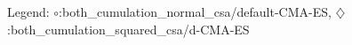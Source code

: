 Legend: {\color{CornflowerBlue}$\circ$}:both\_cumulation\_normal\_csa/default-CMA-ES, {\color{Orange}$\diamondsuit$}:both\_cumulation\_squared\_csa/d-CMA-ES